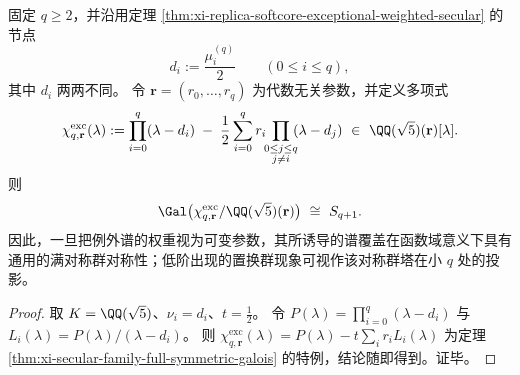 \begin{corollary}\label{cor:xi-exceptional-secular-generic-full-symmetric}
固定 \(q\ge 2\)，并沿用定理 \ref{thm:xi-replica-softcore-exceptional-weighted-secular} 的节点
\[
d_i:=\frac{\mu_i^{(q)}}2\qquad(0\le i\le q),
\]
其中 \(d_i\) 两两不同。
令 \(\mathbf r=(r_0,\dots,r_q)\) 为代数无关参数，并定义多项式
\[
\chi^{\mathrm{exc}}_{q,\mathbf r}(\lambda)
:=
\prod_{i=0}^{q}(\lambda-d_i)
\;-\;
\frac12\sum_{i=0}^{q} r_i\!\!\prod_{\substack{0\le j\le q\\ j\ne i}}\!\!(\lambda-d_j)
\ \in\ \QQ(\sqrt5)(\mathbf r)[\lambda].
\]
则
\[
\Gal\bigl(\chi^{\mathrm{exc}}_{q,\mathbf r}/\QQ(\sqrt5)(\mathbf r)\bigr)\ \cong\ S_{q+1}.
\]
因此，一旦把例外谱的权重视为可变参数，其所诱导的谱覆盖在函数域意义下具有通用的满对称群对称性；低阶出现的置换群现象可视作该对称群塔在小 \(q\) 处的投影。
\end{corollary}
\begin{proof}
取 \(K=\QQ(\sqrt5)\)、\(\nu_i=d_i\)、\(t=\tfrac12\)。
令
\(
P(\lambda)=\prod_{i=0}^{q}(\lambda-d_i)
\)
与
\(
L_i(\lambda)=P(\lambda)/(\lambda-d_i)
\)。
则 \(\chi^{\mathrm{exc}}_{q,\mathbf r}(\lambda)=P(\lambda)-t\sum_i r_iL_i(\lambda)\) 为定理 \ref{thm:xi-secular-family-full-symmetric-galois} 的特例，结论随即得到。证毕。
\end{proof}

\endinput
